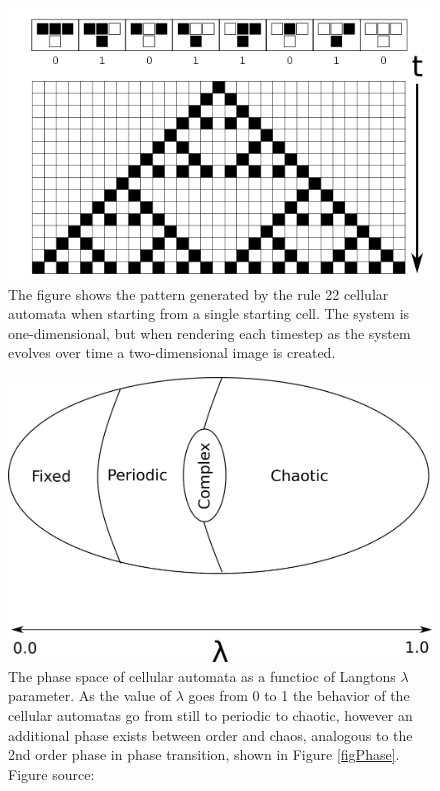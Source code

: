 \begin{figure}[h!]
  \centering
  \includegraphics[width=1\textwidth]{fig/ca22t.png}
  \caption{
    The figure shows the pattern generated by the rule 22 cellular automata when
    starting from a single starting cell.
    The system is one-dimensional, but when rendering each timestep as the
    system evolves over time a two-dimensional image is created.
  }
  \label{figCA22}
\end{figure}
\begin{figure}[h!]
  \centering
  \includegraphics[width=1\textwidth]{fig/egg.png}
  \caption{
    The phase space of cellular automata as a functioc of Langtons $λ$
    parameter.
    As the value of $λ$ goes from 0 to 1 the behavior of the cellular automatas
    go from still to periodic to chaotic, however an additional phase exists
    between order and chaos, analogous to the 2nd order phase in phase
    transition, shown in Figure \ref{figPhase}.
    Figure source: \cite{LANGTON91}
  }
  \label{figCAegg}
\end{figure}
